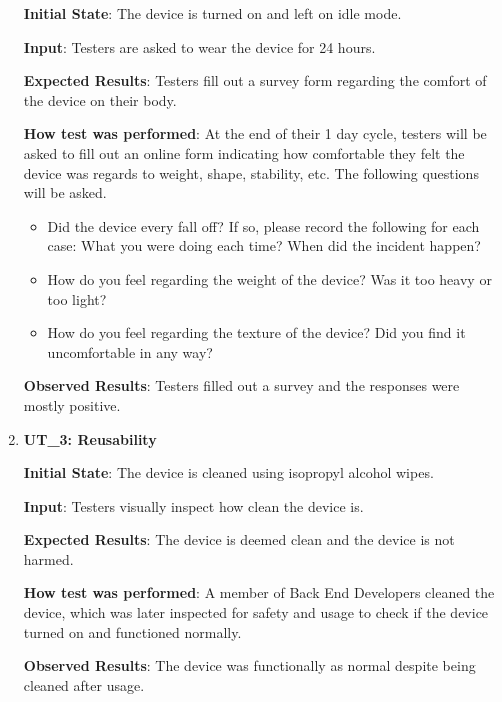 \documentclass[12pt, titlepage]{article}
\begin{document}
\begin{enumerate}
  \textbf{Initial State}: The device is turned on and left on idle mode.

  \textbf{Input}: Testers are asked to wear the device for 24 hours.

  \textbf{Expected Results}: Testers fill out a survey form regarding the comfort of the device on their body.

  \textbf{How test was performed}: At the end of their 1 day cycle, testers will be asked to fill out an online form indicating how comfortable they felt the device was regards to weight, shape, stability, etc. The following questions will be asked.

  \begin{itemize}
    \item Did the device every fall off? If so, please record the following for each case: What you were doing each time? When did the incident happen?
    \item How do you feel regarding the weight of the device? Was it too heavy or too light?
    \item How do you feel regarding the texture of the device? Did you find it uncomfortable in any way?
  \end{itemize}

  \textbf{Observed Results}: Testers filled out a survey and the responses were mostly positive.

  \item\textbf{{UT\_3: Reusability\\}}\label{UT3}

  \textbf{Initial State}: The device is cleaned using isopropyl alcohol wipes.

  \textbf{Input}: Testers visually inspect how clean the device is.

  \textbf{Expected Results}: The device is deemed clean and the device is not harmed.

  \textbf{How test was performed}: A member of Back End Developers cleaned the device, which was later inspected for safety and usage to check if the device turned on and functioned normally.

  \textbf{Observed Results}: The device was functionally as normal despite being cleaned after usage.

\end{enumerate}
\end{document}
